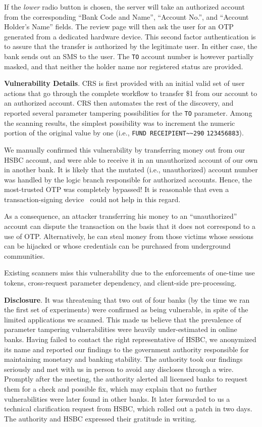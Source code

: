 \documentclass[letter]{sig-alternate-2013}
\begin{document}
If the \textit{lower} radio button is chosen, the server will take an authorized account from the corresponding ``Bank Code and Name'', ``Account No.'', and ``Account Holder's Name'' fields. The review page will then ask the user for an OTP generated from a dedicated hardware device. This second factor authentication is to assure that the transfer is authorized by the legitimate user.
In either case, the bank sends out an SMS to the user. The \verb"TO" account number is however partially masked, and that neither the holder name nor registered status are provided.

\textbf{Vulnerability Details}. CRS is first provided with an initial valid set of user actions that go through the complete workflow to transfer \$1 from our account to an authorized account. CRS then automates the rest of the discovery, and reported several parameter tampering possibilities for the  \verb"TO" parameter. Among the scanning results, the simplest possibility was to increment the numeric portion of the original value by one (i.e., \verb"FUND RECEIPIENT~~290" \verb"123456883"). 

We manually confirmed this vulnerability by transferring money out from our HSBC account, and were able to receive it in an unauthorized account of our own in another bank. It is likely that the mutated (i.e., unauthorized) account number was handled by the logic branch responsible for authorized accounts. Hence, the most-trusted OTP was completely bypassed! It is reasonable that even a transaction-signing device~\cite{hsbcnewdevice} could not help in this regard. 

As a consequence, an attacker transferring his money to an ``unauthorized'' account can dispute the transaction on the basis that it does not correspond to a use of OTP. Alternatively, he can steal money from 
those victims whose sessions can be hijacked or whose credentials can be purchased from underground communities.

Existing scanners miss this vulnerability due to the enforcements of one-time use tokens, cross-request parameter dependency, and client-side pre-processing.

\textbf{Disclosure}. It was threatening that two out of four banks (by the time we ran the first set of experiments) were confirmed as being vulnerable, in spite of the limited applications we scanned. This made us believe that the prevalence of parameter tampering vulnerabilities were heavily under-estimated in online banks. Having failed to contact the right representative of HSBC, we anonymized its name and reported our findings to the government authority responsible for maintaining monetary and banking stability. The authority took our findings seriously and met with us in person to avoid any discloses through a wire. Promptly after the meeting, the authority alerted all licensed banks to request them for a check and possible fix, which may explain that no further vulnerabilities were later found in other banks. It later forwarded to us a technical clarification request from HSBC, which rolled out a patch in two days. The authority and HSBC expressed their gratitude in writing.
\end{document}
